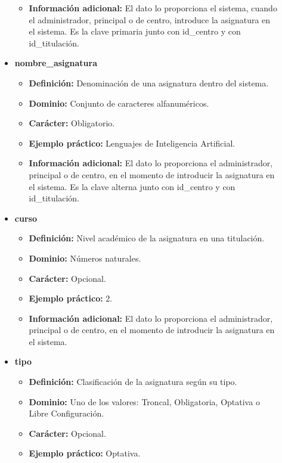 \begin{description}
\begin{itemize}
\begin{itemize}
         \item \textbf{Información adicional:} El dato lo proporciona el sistema, cuando el administrador, principal o de centro, introduce la asignatura en el sistema. Es la clave primaria junto con id\_centro y con id\_titulación.
      \end{itemize}
   \item \textbf{nombre\_asignatura}
      \begin{itemize}
         \item \textbf{Definición:} Denominación de una asignatura dentro del sistema.
         \item \textbf{Dominio:} Conjunto de caracteres alfanuméricos.
         \item \textbf{Carácter:}  Obligatorio.
         \item \textbf{Ejemplo práctico:} Lenguajes de Inteligencia Artificial.
         \item \textbf{Información adicional:} El dato lo proporciona el administrador, principal o de
         centro, en el momento de introducir la asignatura en el sistema. Es la clave alterna junto con
         id\_centro y con id\_titulación.
      \end{itemize}
   \item \textbf{curso}
      \begin{itemize}
         \item \textbf{Definición:} Nivel académico de la asignatura en una titulación.
         \item \textbf{Dominio:} Números naturales.
         \item \textbf{Carácter:}  Opcional.
         \item \textbf{Ejemplo práctico:} 2.
         \item \textbf{Información adicional:} El dato lo proporciona el administrador, principal o de
         centro, en el momento de introducir la asignatura en el sistema.
      \end{itemize}
   \item \textbf{tipo}
      \begin{itemize}
         \item \textbf{Definición:} Clasificación de la asignatura según su tipo.
         \item \textbf{Dominio:} Uno de los valores: Troncal, Obligatoria, Optativa o Libre Configuración.
         \item \textbf{Carácter:}  Opcional.
         \item \textbf{Ejemplo práctico:} Optativa.

\end{itemize}
\end{itemize}
\end{description}
